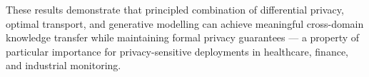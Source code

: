 \documentclass[a4paper,fleqn]{cas-sc}
\begin{document}
These results demonstrate that principled combination of differential
privacy, optimal transport, and generative modelling can achieve
meaningful cross-domain knowledge transfer while maintaining formal
privacy guarantees --- a property of particular importance for
privacy-sensitive deployments in healthcare, finance, and industrial
monitoring.




\end{document}
